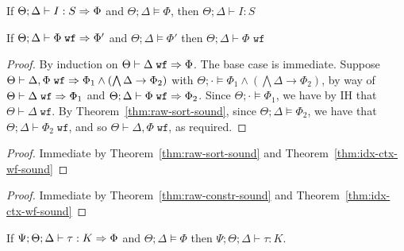 \begin{theorem}
If $\Theta;\Delta \vdash I : S \Rightarrow \Phi$ and $\Theta;\Delta \vDash \Phi$, then $\Theta;\Delta \vdash I : S$ 
\label{thm:raw-sort-sound}
\end{theorem}

\begin{theorem}
If $\Theta ; \Delta \vdash \Phi \; \texttt{wf} \Rightarrow \Phi'$ and $\Theta ; \Delta \vDash \Phi'$ then
$\Theta ; \Delta \vdash \Phi \texttt{ wf}$
\label{thm:raw-constr-sound}
\end{theorem}

\idxctxwfsound*
\begin{proof}
By induction on $\Theta \vdash \Delta \; \texttt{wf} \Rightarrow \Phi$. The base case is immediate. Suppose $\Theta \vdash \Delta, \Phi \; \texttt{wf} \Rightarrow \Phi_1 \wedge (\bigwedge \Delta \to \Phi_2)$ with $\Theta ; \cdot \vDash \Phi_1 \wedge (\bigwedge \Delta \to \Phi_2)$, by way of
$\Theta \vdash \Delta \; \texttt{wf} \Rightarrow \Phi_1$ and $\Theta ; \Delta \vdash \Phi \; \texttt{wf} \Rightarrow \Phi_2$.
Since $\Theta ; \cdot \vDash \Phi_1$, we have by IH that $\Theta \vdash \Delta \; \texttt{wf}$. By Theorem~\ref{thm:raw-sort-sound}, since $\Theta ; \Delta \vDash \Phi_2$, we have that $\Theta ; \Delta \vdash \Phi_2 \; \texttt{wf}$, and so $\Theta \vdash \Delta, \Phi \; \texttt{wf}$, as required.
\end{proof}

\sortsound*
\begin{proof}
Immediate by Theorem~\ref{thm:raw-sort-sound} and Theorem~\ref{thm:idx-ctx-wf-sound}
\end{proof}


\constrsound*
\begin{proof}
Immediate by Theorem~\ref{thm:raw-constr-sound} and Theorem~\ref{thm:idx-ctx-wf-sound}
\end{proof}

\begin{theorem}
If $\Psi ; \Theta ; \Delta \vdash \tau : K \Rightarrow \Phi$ and $\Theta ; \Delta \vDash \Phi$ then $\Psi ; \Theta ; \Delta \vdash \tau : K$.
\label{thm:raw-kind-sound}
\end{theorem}


